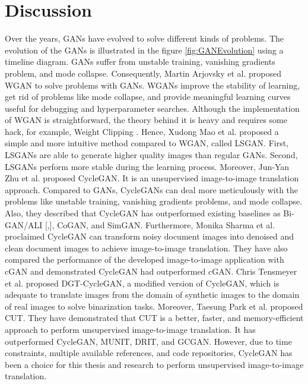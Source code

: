\section{Discussion}\label{rwdiscussion}
Over the years, \acp{GAN} have evolved to solve different kinds of problems. The evolution of the \acp{GAN} is illustrated in the figure \ref{fig:GANEvolution} using a timeline diagram. \acp{GAN} suffer from unstable training, vanishing gradients problem, and mode collapse. Consequently, Martin Arjovsky et al.\cite{arjovsky2017wasserstein} proposed \ac{WGAN} to solve problems with \acp{GAN}. \acp{WGAN} improve the stability of learning, get rid of problems like mode collapse, and provide meaningful learning curves useful for debugging and hyperparameter searches. Although the implementation of \ac{WGAN} is straightforward, the theory behind it is heavy and requires some hack, for example, Weight Clipping \cite{gulrajani2017improved}. Hence, Xudong Mao et al.\cite{mao2017squares} proposed a simple and more intuitive method compared to \ac{WGAN}, called \ac{LSGAN}. First, \acp{LSGAN} are able to generate higher quality images than regular \acp{GAN}. Second, \acp{LSGAN} perform more stable during the learning process. Moreover, Jun-Yan Zhu et al.\cite{zhu2020unpaired} proposed \ac{CycleGAN}. It is an unsupervised image-to-image translation approach. Compared to \acp{GAN}, \acp{CycleGAN} can deal more meticulously with the problems like unstable training, vanishing gradients problems, and mode collapse. Also, they described that \ac{CycleGAN} has outperformed existing baselines as Bi-GAN/ALI [\cite{donahue2017adversarial},\cite{dumoulin2017adversarially}], CoGAN\cite{liu2016coupled}, and SimGAN\cite{shrivastava2017learning}. Furthermore, Monika Sharma et al.\cite{sharma2019learning} proclaimed  \ac{CycleGAN} can transform noisy document images into denoised and clean document images to achieve image-to-image translation. They have also compared the performance of the developed image-to-image application with \ac{cGAN} and demonstrated \ac{CycleGAN} had outperformed \ac{cGAN}. Chris Tensmeyer et al.\cite{8978087} proposed DGT-CycleGAN, a modified version of \ac{CycleGAN}, which is adequate to translate images from the domain of synthetic images to the domain of real images to solve binarization tasks. Moreover, Taesung Park et al.\cite{park2020contrastive} proposed \ac{CUT}. They have demonstrated that \ac{CUT} is a better, faster, and memory-efficient approach to perform unsupervised image-to-image translation. It has outperformed \ac{CycleGAN}\cite{zhu2020unpaired}, \ac{MUNIT}\cite{liu2018unsupervised}, \ac{DRIT}\cite{lee2019drit}, and \ac{GCGAN}\cite{fu2018geometryconsistent}. However, due to time constraints, multiple available references, and code repositories, \ac{CycleGAN} has been a choice for this thesis and research to perform unsupervised image-to-image translation.


